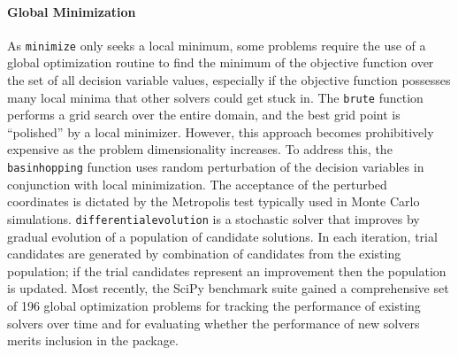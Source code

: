 \paragraph{Global Minimization}
As \texttt{minimize} only seeks a local minimum, some problems require the use of a global optimization routine to find the minimum of the objective function over the set of all decision variable values, especially if the objective function possesses many local minima that other solvers could get stuck in. %
The \texttt{brute} function performs a grid search over the entire domain, and the best grid point is ``polished'' by a local minimizer. However, this approach becomes prohibitively expensive as the problem dimensionality increases.
To address this, the
\texttt{basinhopping} \cite{Wales1997} function uses random perturbation of the decision variables in conjunction with local minimization. The acceptance of the perturbed coordinates is dictated by the Metropolis test typically used in Monte Carlo simulations. 
\texttt{differential\textunderscore evolution} \cite{Wormington1999,Storn1997} is a stochastic solver that improves by gradual evolution of a population of candidate solutions. In each iteration, trial candidates are generated by combination of candidates from the existing population; if the trial candidates represent an improvement then the population is updated. 
Most recently, the SciPy benchmark suite gained a comprehensive set of 196 global optimization problems
for tracking the performance of existing solvers over time and for evaluating whether the performance of new solvers merits inclusion in the package. 
